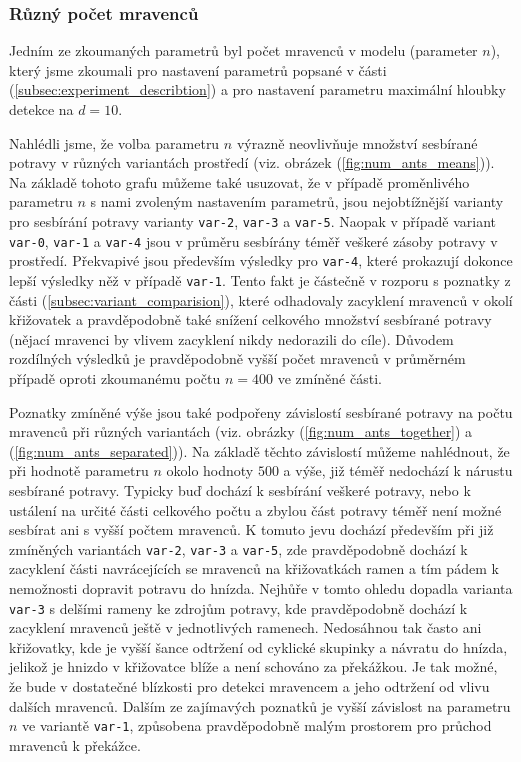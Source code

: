 \documentclass[10pt,a4paper,twocolumn]{article}
\begin{document}
\subsubsection{Různý počet mravenců}

Jedním ze zkoumaných parametrů byl počet mravenců v modelu (parameter
$n$), který jsme zkoumali pro nastavení parametrů popsané v části 
(\ref{subsec:experiment_describtion}) a pro nastavení parametru maximální
hloubky detekce na $d=10$.

Nahlédli jsme, že volba parametru $n$ výrazně neovlivňuje 
množství sesbírané potravy v různých variantách prostředí 
(viz. obrázek (\ref{fig:num_ants_means})). Na základě tohoto grafu 
můžeme také usuzovat, že v případě proměnlivého parametru $n$ s 
nami zvoleným nastavením parametrů, jsou nejobtížnější varianty pro
sesbírání potravy varianty \texttt{var-2}, \texttt{var-3} a \texttt{var-5}.
Naopak v případě variant \texttt{var-0}, \texttt{var-1} a \texttt{var-4}
jsou v průměru sesbírány téměř veškeré zásoby potravy v prostředí.
Překvapivé jsou především výsledky pro \texttt{var-4}, které prokazují
dokonce lepší výsledky něž v případě \texttt{var-1}. Tento fakt je 
částečně v rozporu s poznatky z části (\ref{subsec:variant_comparision}),
které odhadovaly zacyklení mravenců v okolí křižovatek a pravděpodobně
také snížení celkového množství sesbírané potravy (nějací mravenci
by vlivem zacyklení nikdy nedorazili do cíle). Důvodem rozdílných 
výsledků je pravděpodobně vyšší počet mravenců v průměrném případě 
oproti zkoumanému počtu $n=400$ ve zmíněné části.

Poznatky zmíněné výše jsou také podpořeny závislostí sesbírané potravy 
na počtu mravenců při různých variantách (viz. obrázky 
(\ref{fig:num_ants_together}) a (\ref{fig:num_ants_separated})).
Na základě těchto závislostí můžeme nahlédnout, že při hodnotě 
parametru $n$ okolo hodnoty $500$ a výše, již téměř nedochází k nárustu
sesbírané potravy. Typicky buď dochází k sesbírání veškeré potravy, 
nebo k ustálení na určité části celkového počtu a zbylou část
potravy téměř není možné sesbírat ani s vyšší počtem mravenců. 
K tomuto jevu dochází především při již zmíněných variantách 
\texttt{var-2}, \texttt{var-3} a \texttt{var-5}, zde pravděpodobně
dochází k zacyklení části navrácejících se mravenců na křižovatkách
ramen a tím pádem k nemožnosti dopravit potravu do hnízda. Nejhůře v 
tomto ohledu dopadla varianta \texttt{var-3} s delšími rameny 
ke zdrojům potravy, kde pravděpodobně dochází k zacyklení mravenců ještě 
v jednotlivých ramenech. Nedosáhnou tak často ani křižovatky, kde je 
vyšší šance odtržení od cyklické skupinky a návratu do hnízda, jelikož
je hnizdo v křižovatce blíže a není schováno za překážkou. Je tak možné,
že bude v dostatečné blízkosti pro detekci mravencem a jeho odtržení od
vlivu dalších mravenců. Dalším ze zajímavých poznatků je vyšší závislost
na parametru $n$ ve variantě \texttt{var-1}, způsobena pravděpodobně
malým prostorem pro průchod mravenců k překážce.
\end{document}
